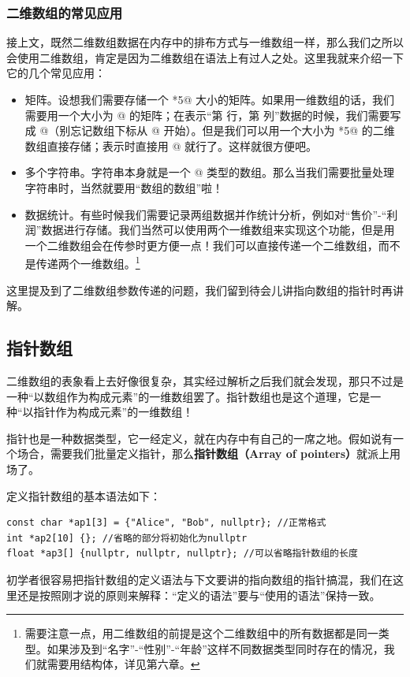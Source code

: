 \subsubsection*{二维数组的常见应用}
接上文，既然二维数组数据在内存中的排布方式与一维数组一样，那么我们之所以会使用二维数组，肯定是因为二维数组在语法上有过人之处。这里我就来介绍一下它的几个常见应用：
\begin{itemize}
    \item 矩阵。设想我们需要存储一个 *5@ 大小的矩阵。如果用一维数组的话，我们需要用一个大小为 @ 的矩阵；在表示``第 \lstinline@n@ 行，第 \lstinline@m@ 列''数据的时候，我们需要写成 \lstinline@arr[(n-1)*5+(m-n)]@（别忘记数组下标从 @ 开始）。但是我们可以用一个大小为 *5@ 的二维数组直接存储；表示时直接用 \lstinline@darr[n-1][m-1]@ 就行了。这样就很方便吧。
    \item 多个字符串。字符串本身就是一个 \lstinline@char[N]@ 类型的数组。那么当我们需要批量处理字符串时，当然就要用``数组的数组''啦！
    \item 数据统计。有些时候我们需要记录两组数据并作统计分析，例如对``售价''-``利润''数据进行存储。我们当然可以使用两个一维数组来实现这个功能，但是用一个二维数组会在传参时更方便一点！我们可以直接传递一个二维数组，而不是传递两个一维数组。\footnote{需要注意一点，用二维数组的前提是这个二维数组中的所有数据都是同一类型。如果涉及到``名字''-``性别''-``年龄''这样不同数据类型同时存在的情况，我们就需要用结构体，详见第六章。}
\end{itemize}
这里提及到了二维数组参数传递的问题，我们留到待会儿讲指向数组的指针时再讲解。\par
\subsection*{指针数组}
二维数组的表象看上去好像很复杂，其实经过解析之后我们就会发现，那只不过是一种``以数组作为构成元素''的一维数组罢了。指针数组也是这个道理，它是一种``以指针作为构成元素''的一维数组！\par
指针也是一种数据类型，它一经定义，就在内存中有自己的一席之地。假如说有一个场合，需要我们批量定义指针，那么\textbf{指针数组（Array of pointers）}就派上用场了。\par
定义指针数组的基本语法如下：
\begin{lstlisting}
const char *ap1[3] = {"Alice", "Bob", nullptr}; //正常格式
int *ap2[10] {}; //省略的部分将初始化为nullptr
float *ap3[] {nullptr, nullptr, nullptr}; //可以省略指针数组的长度
\end{lstlisting}
初学者很容易把指针数组的定义语法与下文要讲的指向数组的指针搞混，我们在这里还是按照刚才说的原则来解释：``定义的语法''要与``使用的语法''保持一致。\par
